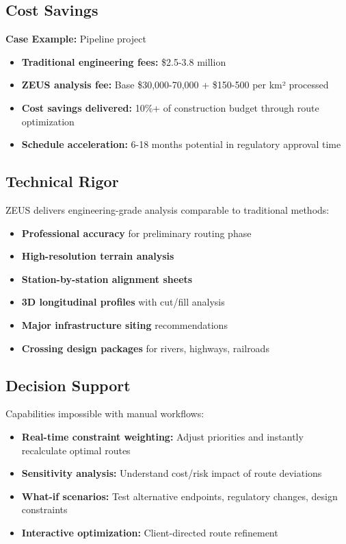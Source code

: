 \documentclass[11pt,letterpaper]{article}
\begin{document}
\subsection{Cost Savings}

\textbf{Case Example:} Pipeline project

\begin{itemize}[leftmargin=*]
    \item \textbf{Traditional engineering fees:} \$2.5-3.8 million
    \item \textbf{ZEUS analysis fee:} Base \$30,000-70,000 + \$150-500 per km² processed
    \item \textbf{Cost savings delivered:} 10\%+ of construction budget through route optimization
    \item \textbf{Schedule acceleration:} 6-18 months potential in regulatory approval time
\end{itemize}

\subsection{Technical Rigor}

ZEUS delivers engineering-grade analysis comparable to traditional methods:

\begin{itemize}[leftmargin=*]
    \item \textbf{Professional accuracy} for preliminary routing phase
    \item \textbf{High-resolution terrain analysis}
    \item \textbf{Station-by-station alignment sheets}
    \item \textbf{3D longitudinal profiles} with cut/fill analysis
    \item \textbf{Major infrastructure siting} recommendations
    \item \textbf{Crossing design packages} for rivers, highways, railroads
\end{itemize}

\subsection{Decision Support}

Capabilities impossible with manual workflows:

\begin{itemize}[leftmargin=*]
    \item \textbf{Real-time constraint weighting:} Adjust priorities and instantly recalculate optimal routes
    \item \textbf{Sensitivity analysis:} Understand cost/risk impact of route deviations
    \item \textbf{What-if scenarios:} Test alternative endpoints, regulatory changes, design constraints
    \item \textbf{Interactive optimization:} Client-directed route refinement
\end{itemize}
\end{document}
